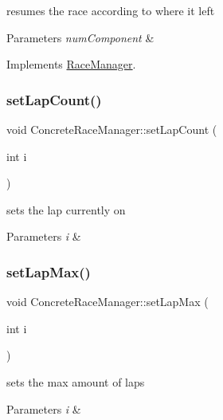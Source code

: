 resumes the race according to where it left 
\begin{DoxyParams}{Parameters}
{\em num\+Component} & \\
\hline
\end{DoxyParams}


Implements \mbox{\hyperlink{class_race_manager_a3a0299ac9a07a2cdc7c1135c6bbff453}{Race\+Manager}}.

\mbox{\label{class_concrete_race_manager_a907ef66be217b4c087dfc943fcd600b1}} 
\subsubsection{\texorpdfstring{set\+Lap\+Count()}{setLapCount()}}
{\footnotesize\ttfamily void Concrete\+Race\+Manager\+::set\+Lap\+Count (\begin{DoxyParamCaption}\item[{int}]{i }\end{DoxyParamCaption})\hspace{0.3cm}{\ttfamily [inline]}}

sets the lap currently on 
\begin{DoxyParams}{Parameters}
{\em i} & \\
\hline
\end{DoxyParams}
\mbox{\label{class_concrete_race_manager_a6843a1fada6e4316c0146322b6b209c8}} 
\subsubsection{\texorpdfstring{set\+Lap\+Max()}{setLapMax()}}
{\footnotesize\ttfamily void Concrete\+Race\+Manager\+::set\+Lap\+Max (\begin{DoxyParamCaption}\item[{int}]{i }\end{DoxyParamCaption})\hspace{0.3cm}{\ttfamily [inline]}}

sets the max amount of laps 
\begin{DoxyParams}{Parameters}
{\em i} & \\
\hline
\end{DoxyParams}
\mbox{\label{class_concrete_race_manager_af9266e7de2aec27b970878b8a68e6276}} 
